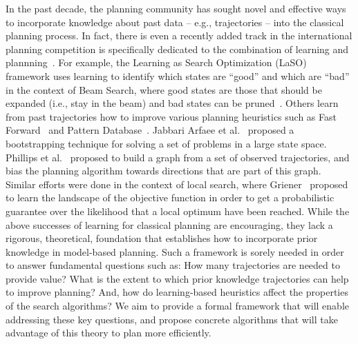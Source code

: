 \documentclass[12pt]{article}
\begin{document}
In the past decade, the planning community has sought novel and effective ways to incorporate knowledge about past data -- e.g., trajectories -- into the classical planning process. 
In fact, there is even a recently added track in the international planning competition is specifically dedicated to the combination of learning and plannning~\cite{fern2011first}.  
For example, the Learning as Search Optimization (LaSO) framework uses learning to identify which states are ``good'' and which are ``bad''
in the context of Beam Search, where good states are those that should be expanded (i.e., stay in the beam) and bad states can be pruned~\cite{xu2007discriminative}. Others learn from past trajectories how to improve various planning heuristics such as Fast Forward~\cite{yoon2006learning} and Pattern Database~\cite{samadi2008learning}. Jabbari Arfaee et al.~\cite{arfaee2011learning} proposed a bootstrapping technique for solving a set of problems in a large state space. 
Phillips et al.~\cite{phillips2012graphs} proposed to build a graph from a set of observed trajectories, and bias the planning algorithm towards directions that are part of this graph. 
Similar efforts were done in the context of local search, 
where Griener~\cite{greiner1996palo} proposed to learn
the landscape of the objective function in order to get a probabilistic guarantee over the likelihood that a local optimum have been reached. 
While the above successes of learning for classical planning are encouraging, they lack a rigorous, theoretical, foundation that establishes how to incorporate prior knowledge in model-based planning. Such a framework is sorely needed in order to answer fundamental questions such as: How many trajectories are needed to provide value? What is the extent to which prior knowledge trajectories can help to improve planning? And, how do learning-based heuristics affect the properties of the search algorithms? We aim to provide a formal framework that will enable addressing these key questions, and propose concrete algorithms that will take advantage of this theory to plan more efficiently. 
\end{document}
